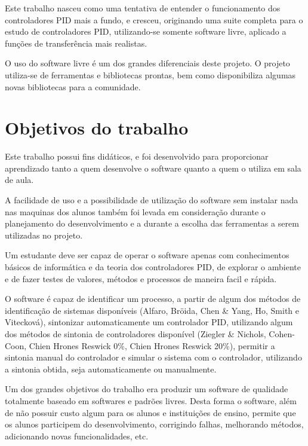     Este trabalho nasceu como uma tentativa de entender o funcionamento dos
    controladores PID mais a fundo, e cresceu, originando uma suite completa
    para o estudo de controladores PID, utilizando-se somente software livre,
    aplicado a funções de transferência mais realistas.

    O uso do software livre é um dos grandes diferenciais deste projeto. O projeto
    utiliza-se de ferramentas e bibliotecas prontas, bem como disponibiliza algumas
    novas bibliotecas para a comunidade.

\section{Objetivos do trabalho}

    Este trabalho possui fins didáticos, e foi desenvolvido para proporcionar
    aprendizado tanto a quem desenvolve o software quanto a quem o utiliza em sala
    de aula.
    
    A facilidade de uso e a possibilidade de utilização do software sem instalar
    nada nas maquinas dos alunos também foi levada em consideração durante o
    planejamento do desenvolvimento e a durante a escolha das ferramentas a serem
    utilizadas no projeto.
    
    Um estudante deve ser capaz de operar o software apenas com conhecimentos
    básicos de informática e da teoria dos controladores \acs{PID}, de explorar o
    ambiente e de fazer testes de valores, métodos e processos de maneira facil e
    rápida.
    
    O software é capaz de identificar um processo, a partir de algum dos
    métodos de identificação de sistemas disponíveis (Alfaro, Bröida, Chen \& Yang,
    Ho, Smith e Vitecková), sintonizar automaticamente um controlador \acs{PID},
    utilizando algum dos métodos de sintonia de controladores disponível (Ziegler
    \& Nichols, Cohen-Coon, Chien Hrones Reswick 0\%, Chien Hrones Reswick 20\%),
    permitir a sintonia manual do controlador e simular o sistema com o controlador,
    utilizando a sintonia obtida, seja automaticamente ou manualmente.
    
    Um dos grandes objetivos do trabalho era produzir um software de qualidade 
    totalmente baseado em softwares e padrões livres. Desta forma o software,
    além de não possuir custo algum para os alunos e instituições de ensino, permite
    que os alunos participem do desenvolvimento, corrigindo falhas, melhorando
    métodos, adicionando novas funcionalidades, etc.
    
